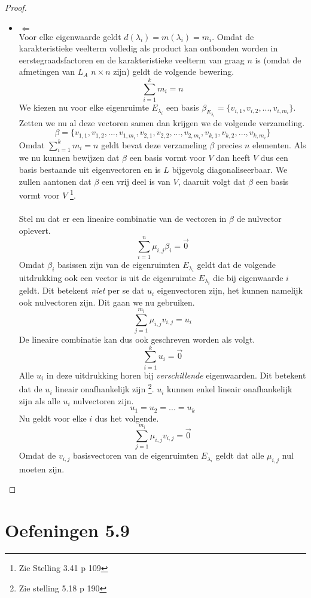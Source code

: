 \documentclass[lineaire_algebra_oplossingen.tex]{subfiles}
\begin{document}
\begin{proof}
\begin{itemize}
\item $\Leftarrow$\\
Voor elke eigenwaarde geldt $d(\lambda_i) = m(\lambda_i) = m_i$.
Omdat de karakteristieke veelterm volledig als product kan ontbonden worden in eerstegraadsfactoren en de karakteristieke veelterm van graag $n$ is (omdat de afmetingen van $L_A$ $n\times
n$ zijn) geldt de volgende bewering.
\[
\sum_{i=1}^km_i = n
\]
We kiezen nu voor elke eigenruimte $E_{\lambda_i}$ een basis $\beta_{E_{\lambda_i}} = \{v_{i,1},v_{i,2},...,v_{i,m_i}\}$. Zetten we nu al deze vectoren samen dan krijgen we de volgende verzameling.
\[
\beta = 
\{
v_{1,1},v_{1,2},...,v_{1,m_i},v_{2,1},v_{2,2},...,v_{2,m_i},v_{k,1},v_{k,2},...,v_{k,m_i}
\}
\]
Omdat $\sum_{i=1}^km_i = n$ geldt bevat deze verzameling $\beta$ precies $n$ elementen.
Als we nu kunnen bewijzen dat $\beta$ een basis vormt voor $V$ dan heeft $V$ dus een basis bestaande uit eigenvectoren en is $L$ bijgevolg diagonaliseerbaar. We zullen aantonen dat $\beta$ een vrij deel is van $V$, daaruit volgt dat $\beta$ een basis vormt voor $V$ \footnote{Zie Stelling 3.41 p 109}.\\\\
Stel nu dat er een lineaire combinatie van de vectoren in $\beta$ de nulvector oplevert.
\[
\sum_{i=1}^n\mu_{i,j}\beta_i = \vec{0}
\]
Omdat $\beta_i$ basissen zijn van de eigenruimten $E_{\lambda_i}$ geldt dat de volgende uitdrukking ook een vector is uit de eigenruimte $E_{\lambda_i}$ die bij eigenwaarde $i$ geldt. Dit betekent \emph{niet} per se dat $u_i$ eigenvectoren zijn, het kunnen namelijk ook nulvectoren zijn. Dit gaan we nu gebruiken.
\[
\sum_{j=1}^{m_i} \mu_{i,j}v_{i,j} = u_i
\]
De lineaire combinatie kan dus ook geschreven worden als volgt.
\[
\sum_{i=1}^ku_i = \vec{0}
\]
Alle $u_i$ in deze uitdrukking horen bij \emph{verschillende} eigenwaarden. Dit betekent dat de $u_i$ lineair onafhankelijk zijn \footnote{Zie stelling 5.18 p 190}. $u_i$ kunnen enkel lineair onafhankelijk zijn als alle $u_i$ nulvectoren zijn.
\[
u_1 = u_2 = ... = u_k
\]
Nu geldt voor elke $i$ dus het volgende.
\[
\sum_{j=1}^{m_i} \mu_{i,j}v_{i,j} = \vec{0}
\]
Omdat de $v_{i,j}$ basisvectoren van de eigenruimten $E_{\lambda_i}$ geldt dat alle $\mu_{i,j}$ nul moeten zijn.
\end{itemize}
\end{proof}





\section{Oefeningen 5.9}
\end{document}
